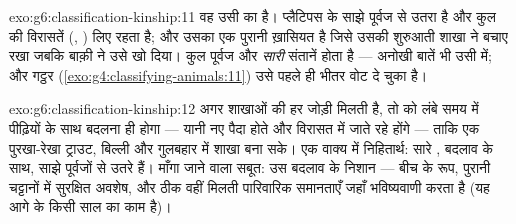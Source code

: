 \begin{solution}{exo:g6:classification-kinship:11}
वह उसी का है। प्लैटिपस  के साझे पूर्वज से उतरा है और कुल की
विरासतें (, ) लिए रहता है; और उसका  एक पुरानी ख़ासियत है जिसे
उसकी शुरुआती शाखा ने बचाए रखा जबकि बाक़ी ने उसे खो दिया। कुल पूर्वज और
\emph{सारी} संतानें होता है --- अनोखी बातें भी उसी में; और गट्ठर
(\cref{exo:g4:classifying-animals:11}) उसे पहले ही भीतर वोट दे चुका
है।
\end{solution}

\begin{solution}{exo:g6:classification-kinship:12}
अगर शाखाओं की हर जोड़ी मिलती है, तो  को लंबे समय में पीढ़ियों
के साथ बदलना ही होगा --- यानी नए  पैदा होते और विरासत में जाते
रहे होंगे --- ताकि एक पुरखा-रेखा ट्राउट, बिल्ली और गुलबहार में शाखा बना
सके। एक वाक्य में निहितार्थ: सारे , बदलाव के साथ, साझे पूर्वजों से
उतरे हैं। माँगा जाने वाला सबूत: उस बदलाव के निशान --- बीच के रूप, पुरानी
चट्टानों में सुरक्षित अवशेष, और ठीक वहीं मिलती पारिवारिक समानताएँ जहाँ
 भविष्यवाणी करता है (यह आगे के किसी साल का काम है)।
\end{solution}

